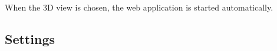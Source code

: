 \begin{minipage}{0.45\textwidth}
When the 3D view is chosen, the web application is started automatically.
\end{minipage} \hfill
\begin{minipage}{0.5\textwidth}
\end{minipage}

\subsection{Settings}

